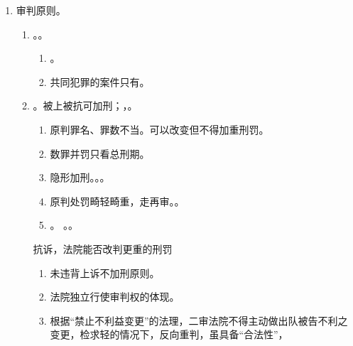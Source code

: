 \begin{enumerate}
\begin{enumerate}
\begin{enumerate}
                \end{enumerate}
          \item 审判原则。
                \begin{enumerate}
                  \item {}。。
                        \begin{enumerate}
                          \item {}。
                          \item 共同犯罪的案件只有。
                        \end{enumerate}
                  \item {}。被上被抗可加刑；，。
                        \begin{enumerate}
                          \item 原判罪名、罪数不当。可以改变但不得加重刑罚。
                          \item 数罪并罚只看总刑期。
                          \item 隐形加刑。。。
                          \item 原判处罚畸轻畸重，走再审。。
                          \item {}。
                                \yi {}。\er {}。
                        \end{enumerate}
                        \begin{kk}{抗诉，法院能否改判更重的刑罚}
                          \begin{enumerate}
                            \item 未违背上诉不加刑原则。
                            \item 法院独立行使审判权的体现。
                            \item 根据“禁止不利益变更”的法理，二审法院不得主动做出队被告不利之变更，检求轻的情况下，反向重判，虽具备“合法性”，

\end{enumerate}
\end{kk}
\end{enumerate}
\end{enumerate}
\end{enumerate}
